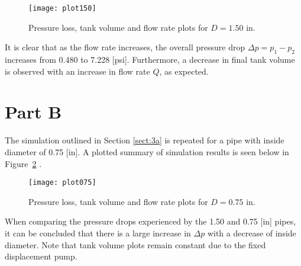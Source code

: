 \begin{figure}[H]
	\centering
	\texttt{[image: plot150]}
	\caption{Pressure loss, tank volume and flow rate plots for $D=1.50$ in.}
	\label{fig:plot150}
\end{figure}

It is clear that as the flow rate increases, the overall pressure drop $\Delta p= p_1 - p_2$ increases from 0.480 to 7.228 [psi]. Furthermore, a decrease in final tank volume is observed with an increase in flow rate $Q$, as expected.

\section{Part B}
\label{sect:3b}

The simulation outlined in Section \ref{sect:3a} is repeated for a pipe with inside diameter of 0.75 [in]. A plotted summary of simulation results is seen below in Figure~\ref{fig:plot075} \cite{matlab}.

\begin{figure}[H]
	\centering
	\texttt{[image: plot075]}
	\caption{Pressure loss, tank volume and flow rate plots for $D=0.75$ in.}
	\label{fig:plot075}
\end{figure}

\pagebreak

When comparing the pressure drops experienced by the 1.50 and 0.75 [in] pipes, it can be concluded that there is a large increase in $\Delta p$ with a decrease of inside diameter. Note that tank volume plots remain constant due to the fixed displacement pump.